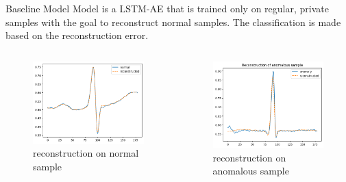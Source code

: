 \begin{frame}{Baseline Model}
    Model is a LSTM-AE that is \alert{trained only on regular, private samples} with the goal to reconstruct normal samples. The classification is made based on the reconstruction error.
    \begin{columns}
        \begin{column}{0.48\textwidth}
        \begin{figure}
            \centering
            \includegraphics[scale=0.3]{images/rec_normal.png}
            \caption{reconstruction on normal sample \phantom{asdfsadf}}
            \label{fig:enter-label}
        \end{figure}
    \end{column}
    \begin{column}{0.48\textwidth}
        \begin{figure}
            \centering
            \includegraphics[scale=0.3]{images/rec_anom.png}
            \caption{reconstruction on anomalous sample}
            \label{fig:enter-label}
        \end{figure}
    \end{column}
    \end{columns}
\end{frame}

